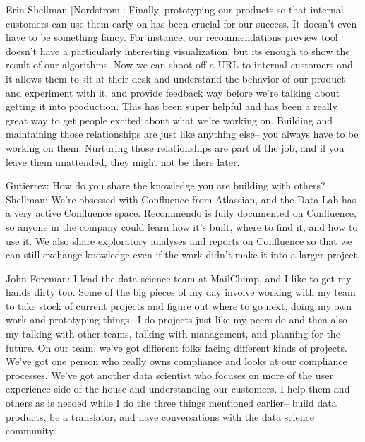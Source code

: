 Erin Shellman [Nordstrom]: Finally, prototyping our products so that internal
customers can use them early on has been crucial for
our success. It doesn't even have to be something
fancy. For instance, our recommendations preview
tool doesn't have a particularly interesting
visualization, but its enough to show the result of our
algorithms. Now we can shoot off a URL to internal
customers and it allows them to sit at their desk and
understand the behavior of our product and
experiment with it, and provide feedback way before
we're talking about getting it into production. This
has been super helpful and has been a really great
way to get people excited about what we're working
on. Building and maintaining those relationships are
just like anything else-- you always have to be
working on them. Nurturing those relationships are
part of the job, and if you leave them unattended,
they might not be there later.

Gutierrez: How do you share the knowledge you are
building with others?
Shellman: We’re obsessed with Conﬂuence from
Atlassian, and the Data Lab has a very active
Conﬂuence space. Recommendo is fully documented
on Conﬂuence, so anyone in the company could learn
how it’s built, where to ﬁnd it, and how to use it. We
also share exploratory analyses and reports on
Conﬂuence so that we can still exchange knowledge
even if the work didn’t make it into a larger project.

John Foreman: I lead the data science team at
MailChimp, and I like to get my hands dirty too.
Some of the big pieces of my day involve working
with my team to take stock of current projects and
figure out where to go next, doing my own work and
prototyping things-- I do projects just like my peers
do and then also my talking with other teams,
talking with management, and planning for the
future.
On our team, we’ve got different folks facing different
kinds of projects. We’ve got one person who really
owns compliance and looks at our compliance
processes. We’ve got another data scientist who
focuses on more of the user experience side of the
house and understanding our customers. I help them
and others as is needed while I do the three things
mentioned earlier-- build data products, be a
translator, and have conversations with the data
science community.

